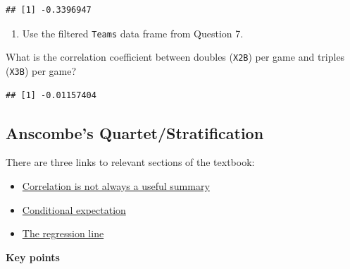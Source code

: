 \documentclass[
]{article}
\newenvironment{Shaded}{\begin{snugshade}}{\end{snugshade}}
\newcommand{\KeywordTok}[1]{\textcolor[rgb]{0.13,0.29,0.53}{\textbf{#1}}}
\newcommand{\NormalTok}[1]{#1}
\newcommand{\OperatorTok}[1]{\textcolor[rgb]{0.81,0.36,0.00}{\textbf{#1}}}
\providecommand{\tightlist}{%
  \setlength{\itemsep}{0pt}\setlength{\parskip}{0pt}}
\begin{document}
\begin{verbatim}
## [1] -0.3396947
\end{verbatim}

\begin{enumerate}
\def\labelenumi{\arabic{enumi}.}
\setcounter{enumi}{8}
\tightlist
\item
  Use the filtered \texttt{Teams} data frame from Question 7.
\end{enumerate}

What is the correlation coefficient between doubles (\texttt{X2B}) per
game and triples (\texttt{X3B}) per game?

\begin{Shaded}
\end{Shaded}

\begin{verbatim}
## [1] -0.01157404
\end{verbatim}

\hypertarget{anscombes-quartetstratification}{%
\subsection{Anscombe's
Quartet/Stratification}\label{anscombes-quartetstratification}}

There are three links to relevant sections of the textbook:

\begin{itemize}
\tightlist
\item
  \href{https://rafalab.github.io/dsbook/regression.html\#correlation-is-not-always-a-useful-summary}{Correlation
  is not always a useful summary}
\item
  \href{https://rafalab.github.io/dsbook/regression.html\#conditional-expectation}{Conditional
  expectation}
\item
  \href{https://rafalab.github.io/dsbook/regression.html\#the-regression-line}{The
  regression line}
\end{itemize}

\textbf{Key points}
\end{document}
